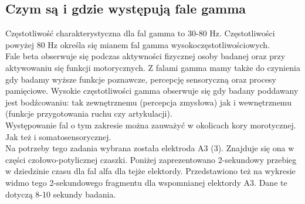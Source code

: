 \documentclass{article}
\begin{document}
    \subsection{Czym są i gdzie występują fale gamma}
    
    Częstotliwość charakterystyczna dla fal gamma to 30-80 Hz. Częstotliwości powyżej 80 Hz określa się mianem fal gamma wysokoczęstotliwościowych. \\

    Fale beta obserwuje się podczas aktywności fizycznej osoby badanej oraz przy aktywowaniu się funkcji motorycznych. Z falami gamma mamy także do czynienia gdy badamy wyższe funkcje poznawcze, percepcję sensoryczną oraz procesy pamięciowe. Wysokie częstotliwości gamma obserwuje się gdy badany poddawany jest bodźcowaniu: tak zewnętrznemu (percepcja zmysłowa) jak i wewnętrznemu (funkcje przygotowania ruchu czy artykulacji).\\

    Występowanie fal o tym zakresie można zauważyć w okolicach kory morotycznej. Jak też i somatosensorycznej.\\

    Na potrzeby tego zadania wybrana została elektroda A3 (3). Znajduje się ona w części czołowo-potylicznej czaszki. Poniżej zaprezentowano 2-sekundowy przebieg w dziedzinie czasu dla fal alfa dla tejże elektordy. Przedstawiono też na wykresie widmo tego 2-sekundowego fragmentu dla wspomnianej elektordy A3. Dane te dotyczą 8-10 sekundy badania.
    
    \newpage
\end{document}
